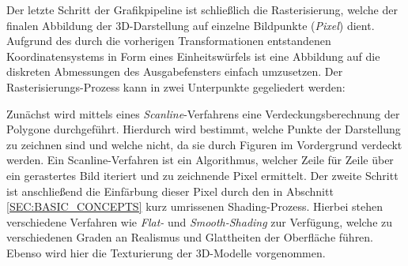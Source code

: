 Der letzte Schritt der Grafikpipeline ist schließlich die Rasterisierung, welche der finalen Abbildung der 3D-Darstellung auf einzelne Bildpunkte (\emph{Pixel}) dient. Aufgrund des durch die vorherigen Transformationen entstandenen Koordinatensystems in Form eines Einheitswürfels ist eine Abbildung auf die diskreten Abmessungen des Ausgabefensters einfach umzusetzen. Der Rasterisierungs-Prozess kann in zwei Unterpunkte gegeliedert werden:

Zunächst wird mittels eines \emph{Scanline}-Verfahrens eine Verdeckungsberechnung der Polygone durchgeführt. Hierdurch wird bestimmt, welche Punkte der Darstellung zu zeichnen sind und welche nicht, da sie durch Figuren im Vordergrund verdeckt werden. Ein Scanline-Verfahren ist ein Algorithmus, welcher Zeile für Zeile über ein gerastertes Bild iteriert und zu zeichnende Pixel ermittelt. Der zweite Schritt ist anschließend die Einfärbung dieser Pixel durch den in Abschnitt \ref{SEC:BASIC_CONCEPTS} kurz umrissenen Shading-Prozess. Hierbei stehen verschiedene Verfahren wie \emph{Flat-} und \emph{Smooth-Shading} zur Verfügung, welche zu verschiedenen Graden an Realismus und Glattheiten der Oberfläche führen. Ebenso wird hier die Texturierung der 3D-Modelle vorgenommen.
